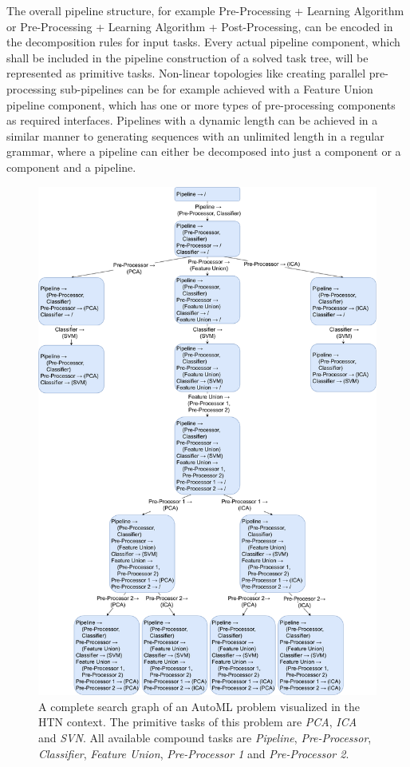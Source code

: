The overall pipeline structure, for example Pre-Processing + Learning Algorithm or Pre-Processing + Learning Algorithm + Post-Processing, can be encoded in the decomposition rules for input tasks.
Every actual pipeline component, which shall be included in the pipeline construction of a solved task tree, will be represented as primitive tasks.\newline
Non-linear topologies like creating parallel pre-processing sub-pipelines can be for example achieved with a Feature Union pipeline component, which has one or more types of pre-processing components as required interfaces.
Pipelines with a dynamic length can be achieved in a similar manner to generating sequences with an unlimited length in a regular grammar, where a pipeline can either be decomposed into just a component or a component and a pipeline.
\begin{figure}[ht!]
    \centering
    \includegraphics[width=\textwidth]{gfx/Figures/Approach/HTNAutoML.pdf}
    \caption[A complete search graph of an AutoML problem visualized in the HTN context.]{A complete search graph of an AutoML problem visualized in the HTN context. The primitive tasks of this problem are \textit{PCA}, \textit{ICA} and \textit{SVN}.
    All available compound tasks are \textit{Pipeline}, \textit{Pre-Processor}, \textit{Classifier}, \textit{Feature Union}, \textit{Pre-Processor 1} and \textit{Pre-Processor 2}.}
    \label{fig:approach:htn-automl}
\end{figure}

